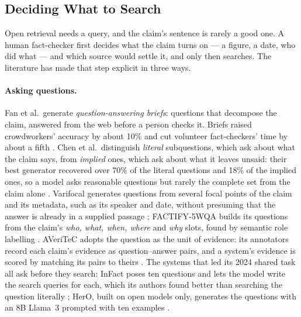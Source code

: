 
\subsection{Deciding What to Search}
\label{subsec:sota-what-to-search}

Open retrieval needs a query, and the claim's sentence is rarely a good
one. A human fact-checker first decides what the claim turns on --- a
figure, a date, who did what --- and which source would settle it, and
only then searches. The literature has made that step explicit in three
ways.

\paragraph{Asking questions.} Fan et al.\ generate \emph{question-answering
briefs}: questions that decompose the claim, answered from the web
before a person checks it. Briefs raised crowdworkers' accuracy by about
10\% and cut volunteer fact-checkers' time by about a fifth
\cite{fan2020qabriefs}. Chen et al.\ distinguish \emph{literal}
subquestions, which ask about what the claim says, from \emph{implied}
ones, which ask about what it leaves unsaid: their best generator
recovered over 70\% of the literal questions and 18\% of the implied
ones, so a model asks reasonable questions but rarely the complete set
from the claim alone \cite{chen2022claimdecomp}. Varifocal generates
questions from several focal points of the claim and its metadata, such
as its speaker and date, without presuming that the answer is already in
a supplied passage \cite{ousidhoum2022varifocal}; FACTIFY-5WQA builds its
questions from the claim's \emph{who, what, when, where} and \emph{why}
slots, found by semantic role labelling \cite{rani2023factify5wqa}.
AVeriTeC adopts the question as the unit of evidence: its annotators
record each claim's evidence as question--answer pairs, and a system's
evidence is scored by matching its pairs to theirs
\cite{schlichtkrull2023averitec}. The systems that led its 2024 shared
task \cite{schlichtkrull2024sharedtask} all ask before they search:
InFact poses ten questions and lets the model write the search queries
for each, which its authors found better than searching the question
literally \cite{rothermel2024infact}; HerO, built on open models only,
generates the questions with an 8B Llama~3 prompted with ten examples
\cite{yoon2024hero}.

